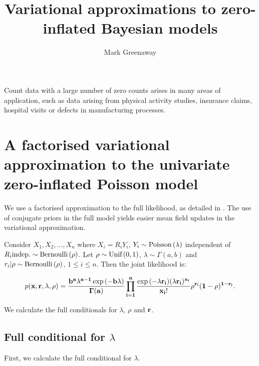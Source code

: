 \documentclass{amsart}
\title{Variational approximations to zero-inflated Bayesian models}
\author{Mark Greenaway}
\begin{document}
\maketitle
Count data with a large number of zero counts arises in many areas of
application, such as data arising from physical activity studies, 
insurance claims, hospital visits or defects in manufacturing processes.

\section{A factorised variational approximation to the univariate zero-inflated Poisson model}


We use a factorised approximation to the full likelihood, as detailed in \cite{ormerod10}.
The use of conjugate priors in the full model yields easier mean field updates in the
variational approximation.

\noindent Consider $X_1, X_2, \ldots, X_n$ where $X_i = R_i Y_i$, $Y_i \sim \text{Poisson} \left( \lambda \right)$ independent of
$R_i \text{indep.} \sim \text{Bernoulli} \left( \rho \right)$. Let $\rho \sim \text{Unif} \left( 0, 1 \right)$, 
$\lambda \sim \Gamma(a, b)$ and $r_i | \rho \sim \text{Bernoulli} \left( \rho \right)$, $1 
\leq i \leq n$. Then the joint likelihood is:

$$
p(\bf x, \bf r, \lambda, \rho) = \frac{b^a \lambda^{a - 1} \exp{(-b \lambda)}}{\Gamma{(a)}} \prod_{i=1}^n \frac{\exp{(-\lambda r_i)} (\lambda r_i)^{x_i}}{x_i !} \rho^{r_i} (1 - \rho)^{1 - r_i}.
$$

\noindent We calculate the full conditionals for $\lambda$, $\rho$ and $\bf r$.

\subsection{Full conditional for $\lambda$}
First, we calculate the full conditional for $\lambda$.
\end{document}
